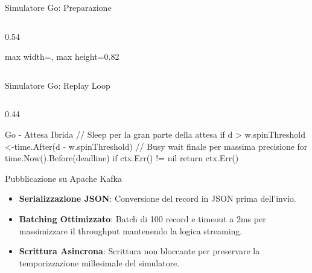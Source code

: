 \documentclass[10pt, aspectratio=169]{beamer}
\begin{document}
\begin{frame}[fragile]{Simulatore Go: Preparazione}
\begin{columns}[c]
\begin{column}{0.54\textwidth}
\begin{adjustbox}{max width=\linewidth, max height=0.82\textheight}
            \end{adjustbox}
        \end{column}
    \end{columns}
\end{frame}

\begin{frame}[fragile]{Simulatore Go: Replay Loop}
    \begin{columns}[c]
        \begin{column}{0.44\textwidth}
            \begin{gocodebox}{Go - Attesa Ibrida}
// Sleep per la gran parte della attesa
if d > w.spinThreshold {
    <-time.After(d - w.spinThreshold)
}
// Busy wait finale per massima precisione
for time.Now().Before(deadline) {
    if ctx.Err() != nil { return ctx.Err() }
}
            \end{gocodebox}
            \vskip 0.02cm
            \begin{block}{\scriptsize Pubblicazione su Apache Kafka}
                \scriptsize
                \begin{itemize}
                    \item \textbf{Serializzazione JSON}: Conversione del record in JSON prima dell'invio.
                    \item \textbf{Batching Ottimizzato}: Batch di 100 record e timeout a 2ms per massimizzare il throughput mantenendo la logica streaming.
                    \item \textbf{Scrittura Asincrona}: Scrittura non bloccante per preservare la temporizzazione millesimale del simulatore.
                \end{itemize}
            \end{block}
        \end{column}


\end{columns}
\end{frame}
\end{document}
